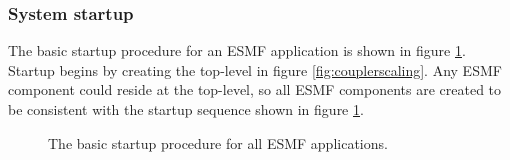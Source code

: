 \subsubsection{System startup}

The basic startup procedure for an ESMF application is shown in figure \ref{fig:ESMFApplicationMain}. Startup
begins by creating the top-level in figure \ref{fig:couplerscaling}. Any ESMF component could reside at the top-level, so
all ESMF components are created to be consistent with the startup sequence shown in figure \ref{fig:ESMFApplicationMain}.

\begin{figure}
\caption[{ESMF Boot Up Stage}]{The basic startup procedure for
all ESMF applications.}
\label{fig:ESMFApplicationMain}
\end{figure}

